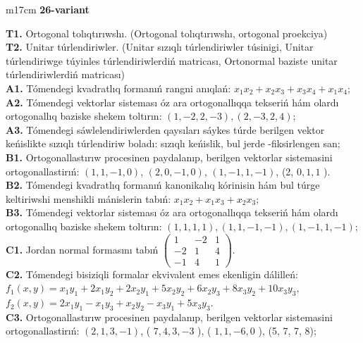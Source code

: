 \documentclass{article}
\begin{document}
\begin{tabular}{m{17cm}}
\textbf{26-variant}
\newline

\textbf{T1.} Ortogonal  tolıqtırıwshı. (Ortogonal tolıqtırıwshı,  ortogonal proekciya) \\
\textbf{T2.} Unitar túrlendiriwler. (Unitar sızıqlı túrlendiriwler túsinigi,  Unitar túrlendiriwge túyinles túrlendiriwlerdiń matricası,   Ortonormal baziste unitar túrlendiriwlerdiń matricası) \\
\textbf{A1.} Tómendegi kvadratlıq formanıń rangni anıqlań: \(x_{1}x_{2} + x_{2}x_{3} + x_{3}x_{4} + x_{1}x_{4}\); \\
\textbf{A2.} Tómendegi vektorlar sisteması óz ara ortogonallıqqa tekseriń hám olardı ortogonallıq baziske shekem toltırın: \((1, - 2,2, - 3),(2, - 3,2,4)\); \\
\textbf{A3.} Tómendegi sáwlelendiriwlerden qaysıları sáykes túrde berilgen vektor keńislikte sızıqlı túrlendiriw boladı: sızıqlı keńislik, bul jerde -fiksirlengen san; \\
\textbf{B1.} Ortogonallastırıw procesinen paydalanıp, berilgen vektorlar sistemasini ortogonallastirıń: \((1,1, - 1,0)\), \((2,0, - 1,0)\), \((1, - 1,1, - 1)\), (2, \(0,1,1\) ). \\
\textbf{B2.} Tómendegi kvadratlıq formanıń kanonikalıq kórinisin hám bul túrge keltiriwshi menshikli mánislerin tabıń: \(x_{1}x_{2} + x_{1}x_{3} + x_{2}x_{3}\); \\
\textbf{B3.} Tómendegi vektorlar sisteması óz ara ortogonallıqqa tekseriń hám olardı ortogonallıq baziske shekem toltırın: \((1,1,1,1),(1,1, - 1, - 1),(1, - 1,1, - 1)\); \\
\textbf{C1.} Jordan normal formasını tabıń \(\begin{pmatrix} 1 & - 2 & 1 \\  - 2 & 1 & 4 \\  - 1 & 4 & 1 \end{pmatrix}\). \\
\textbf{C2.} Tómendegi bisiziqli formalar ekvivalent emes ekenligin dálilleń:\(f_{1}(x,y) = x_{1}y_{1} + 2x_{1}y_{2} + 2x_{2}y_{1} + 5x_{2}y_{2} + 6x_{2}y_{3} + 8x_{3}y_{2} + 10x_{3}y_{3}\), \(f_{2}(x,y) = 2x_{1}y_{1} - x_{1}y_{3} + x_{2}y_{2} - x_{3}y_{1} + 5x_{3}y_{3}\). \\
\textbf{C3.} Ortogonallastırıw procesinen paydalanıp, berilgen vektorlar sistemasini ortogonallastirıń: \((2,1,3, - 1)\), ( \(7,4,3, - 3\) ), ( \(1,1, - 6,0\) ), (5, 7, 7, 8); \\

\end{tabular}
\vspace{1cm}
\end{document}
